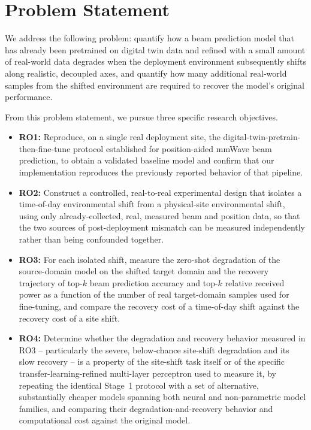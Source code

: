 \documentclass{iutbscthesis}
\begin{document}
\section{Problem Statement}

We address the following problem: quantify how a beam prediction model that has already been pretrained on digital twin data and refined with a small amount of real-world data degrades when the deployment environment subsequently shifts along realistic, decoupled axes, and quantify how many additional real-world samples from the shifted environment are required to recover the model's original performance.

From this problem statement, we pursue three specific research objectives.

\begin{itemize}
    \item \textbf{RO1:} Reproduce, on a single real deployment site, the digital-twin-pretrain-then-fine-tune protocol established for position-aided mmWave beam prediction, to obtain a validated baseline model and confirm that our implementation reproduces the previously reported behavior of that pipeline.
    \item \textbf{RO2:} Construct a controlled, real-to-real experimental design that isolates a time-of-day environmental shift from a physical-site environmental shift, using only already-collected, real, measured beam and position data, so that the two sources of post-deployment mismatch can be measured independently rather than being confounded together.
    \item \textbf{RO3:} For each isolated shift, measure the zero-shot degradation of the source-domain model on the shifted target domain and the recovery trajectory of top-$k$ beam prediction accuracy and top-$k$ relative received power as a function of the number of real target-domain samples used for fine-tuning, and compare the recovery cost of a time-of-day shift against the recovery cost of a site shift.
    \item \textbf{RO4:} Determine whether the degradation and recovery behavior measured in RO3 -- particularly the severe, below-chance site-shift degradation and its slow recovery -- is a property of the site-shift task itself or of the specific transfer-learning-refined multi-layer perceptron used to measure it, by repeating the identical Stage~1 protocol with a set of alternative, substantially cheaper models spanning both neural and non-parametric model families, and comparing their degradation-and-recovery behavior and computational cost against the original model.

\end{itemize}
\end{document}

